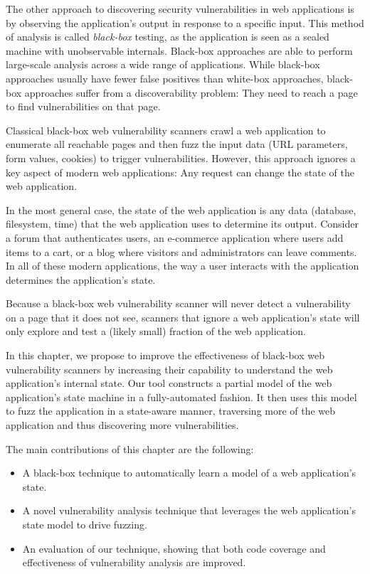 The other approach to discovering security vulnerabilities in web applications
is by observing the application's output in response to a specific input. This
method of analysis is called \emph{black-box} testing, as the application is
seen as a sealed machine with unobservable internals. Black-box approaches are
able to perform large-scale analysis across a wide range of applications. While
black-box approaches usually have fewer false positives than white-box
approaches, black-box approaches suffer from a discoverability problem: They
need to reach a page to find vulnerabilities on that page.

Classical black-box web vulnerability scanners crawl a web application to
enumerate all reachable pages and then fuzz the input data (URL parameters,
form values, cookies) to trigger vulnerabilities. However, this approach
ignores a key aspect of modern web applications: Any request can change the state of the web application.

In the most general case, the state of the web application is any data
(database, filesystem, time) that the web application uses to determine
its output. Consider a forum that authenticates users, an e-commerce
application where users add items to a cart, or a blog where visitors and
administrators can leave comments. In all of these modern applications, the way
a user interacts with the application determines the application's state.

Because a black-box web vulnerability scanner will never detect a vulnerability
on a page that it does not see, scanners that ignore a web application's state
will only explore and test a (likely small) fraction of the web application.

In this chapter, we propose to improve the effectiveness of black-box web vulnerability scanners by
increasing their capability to understand the web application's internal state.
Our tool constructs a partial model of the web application's state machine in a
fully-automated fashion. It then uses this model to fuzz the application in a
state-aware manner, traversing more of the web application and thus discovering
more vulnerabilities.

\noindent{}The main contributions of this chapter are the following:
\begin{itemize}
 \item A black-box technique to automatically learn a model of a web
   application's state. 
 \item A novel vulnerability analysis technique that leverages the web
   application's state model to drive fuzzing.
 \item An evaluation of our technique, showing that both code coverage and
   effectiveness of vulnerability analysis are improved.
\end{itemize}

